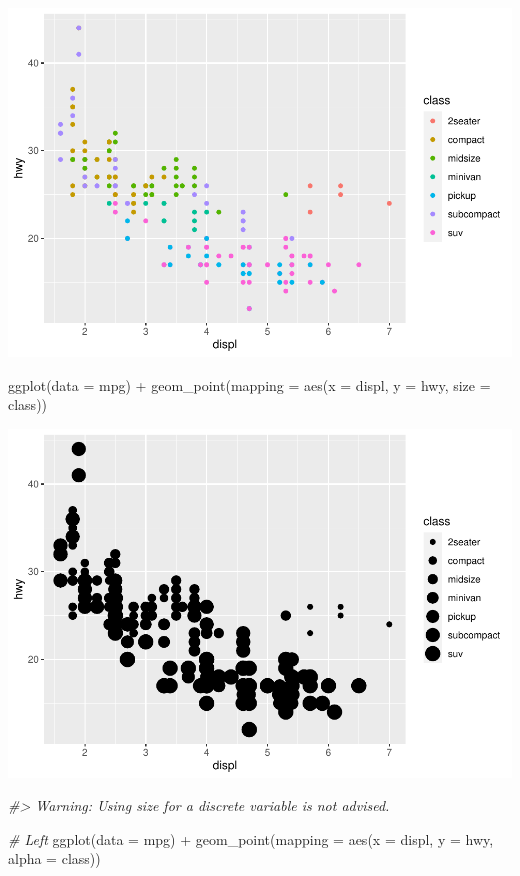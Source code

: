 \documentclass[
]{article}
\newenvironment{Shaded}{\begin{snugshade}}{\end{snugshade}}
\newcommand{\AttributeTok}[1]{\textcolor[rgb]{0.77,0.63,0.00}{#1}}
\newcommand{\CommentTok}[1]{\textcolor[rgb]{0.56,0.35,0.01}{\textit{#1}}}
\newcommand{\FunctionTok}[1]{\textcolor[rgb]{0.00,0.00,0.00}{#1}}
\newcommand{\NormalTok}[1]{#1}
\newcommand{\SpecialCharTok}[1]{\textcolor[rgb]{0.00,0.00,0.00}{#1}}
\begin{document}
\includegraphics{Journal_files/figure-latex/unnamed-chunk-39-1.pdf}

\begin{Shaded}
\begin{Highlighting}[]
\FunctionTok{ggplot}\NormalTok{(}\AttributeTok{data =}\NormalTok{ mpg) }\SpecialCharTok{+} 
  \FunctionTok{geom\_point}\NormalTok{(}\AttributeTok{mapping =} \FunctionTok{aes}\NormalTok{(}\AttributeTok{x =}\NormalTok{ displ, }\AttributeTok{y =}\NormalTok{ hwy, }\AttributeTok{size =}\NormalTok{ class))}
\end{Highlighting}
\end{Shaded}

\includegraphics{Journal_files/figure-latex/unnamed-chunk-39-2.pdf}

\begin{Shaded}
\begin{Highlighting}[]
\CommentTok{\#\textgreater{} Warning: Using size for a discrete variable is not advised.}

\CommentTok{\# Left}
\FunctionTok{ggplot}\NormalTok{(}\AttributeTok{data =}\NormalTok{ mpg) }\SpecialCharTok{+} 
  \FunctionTok{geom\_point}\NormalTok{(}\AttributeTok{mapping =} \FunctionTok{aes}\NormalTok{(}\AttributeTok{x =}\NormalTok{ displ, }\AttributeTok{y =}\NormalTok{ hwy, }\AttributeTok{alpha =}\NormalTok{ class))}
\end{Highlighting}
\end{Shaded}
\end{document}
